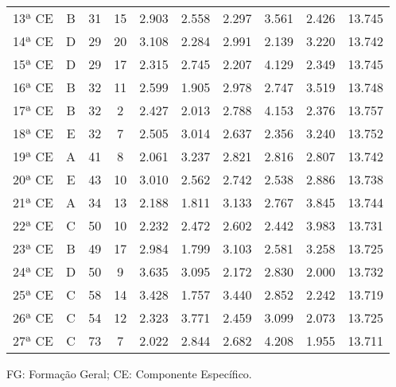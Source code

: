 \documentclass[
  portuguese,
  11pt,
  a4paper,
  DIV=11,
  numbers=noendperiod]{scrreprt}
\begin{document}
\begin{table}
{\begin{tabular*}{\linewidth}{@{\extracolsep{\fill}}cccccccccc}
13ª CE & B & 31 & 15 & 2.903 & 2.558 & 2.297 & 3.561 & 2.426 & 13.745 \\ 
14ª CE & D & 29 & 20 & 3.108 & 2.284 & 2.991 & 2.139 & 3.220 & 13.742 \\ 
15ª CE & D & 29 & 17 & 2.315 & 2.745 & 2.207 & 4.129 & 2.349 & 13.745 \\ 
16ª CE & B & 32 & 11 & 2.599 & 1.905 & 2.978 & 2.747 & 3.519 & 13.748 \\ 
17ª CE & B & 32 & 2 & 2.427 & 2.013 & 2.788 & 4.153 & 2.376 & 13.757 \\ 
18ª CE & E & 32 & 7 & 2.505 & 3.014 & 2.637 & 2.356 & 3.240 & 13.752 \\ 
19ª CE & A & 41 & 8 & 2.061 & 3.237 & 2.821 & 2.816 & 2.807 & 13.742 \\ 
20ª CE & E & 43 & 10 & 3.010 & 2.562 & 2.742 & 2.538 & 2.886 & 13.738 \\ 
21ª CE & A & 34 & 13 & 2.188 & 1.811 & 3.133 & 2.767 & 3.845 & 13.744 \\ 
22ª CE & C & 50 & 10 & 2.232 & 2.472 & 2.602 & 2.442 & 3.983 & 13.731 \\ 
23ª CE & B & 49 & 17 & 2.984 & 1.799 & 3.103 & 2.581 & 3.258 & 13.725 \\ 
24ª CE & D & 50 & 9 & 3.635 & 3.095 & 2.172 & 2.830 & 2.000 & 13.732 \\ 
25ª CE & C & 58 & 14 & 3.428 & 1.757 & 3.440 & 2.852 & 2.242 & 13.719 \\ 
26ª CE & C & 54 & 12 & 2.323 & 3.771 & 2.459 & 3.099 & 2.073 & 13.725 \\ 
27ª CE & C & 73 & 7 & 2.022 & 2.844 & 2.682 & 4.208 & 1.955 & 13.711 \\ 
\bottomrule
\end{tabular*}
\begin{minipage}{\linewidth}
FG: Formação Geral; CE: Componente Específico.\\
\end{minipage}

}

\end{table}%
\end{document}
